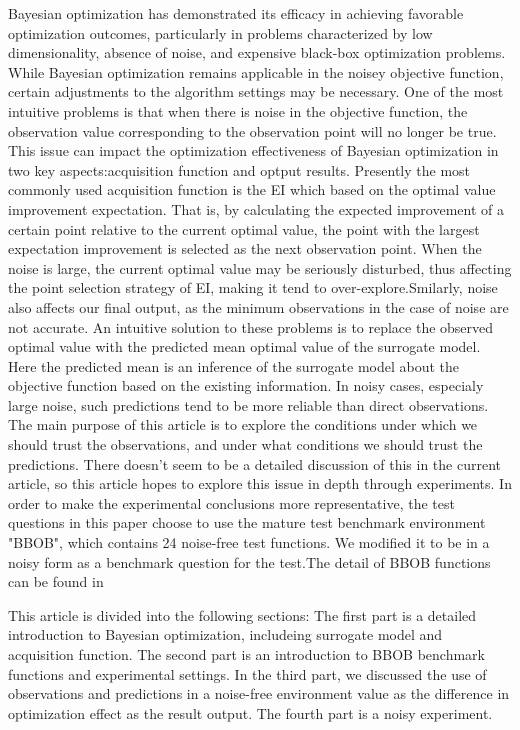 \documentclass{article}
\begin{document}
\hspace{2em}
Bayesian optimization has demonstrated its efficacy in achieving favorable optimization outcomes, particularly in problems characterized by low dimensionality, absence of noise, and expensive black-box optimization problems. While Bayesian optimization remains applicable in the noisey objective function, certain adjustments to the algorithm settings may be necessary. One of the most intuitive problems is that when there is noise in the objective function, the observation value corresponding to the observation point will no longer be true. This issue can impact the optimization effectiveness of Bayesian optimization in two key aspects:acquisition function and optput results. Presently the most commonly used acquisition function is the EI \citep{Jones1998Efficient} which based on the optimal value improvement expectation. That is, by calculating the expected improvement of a certain point relative to the current optimal value, the point with the largest expectation improvement is selected as the next observation point. When the noise is large, the current optimal value may be seriously disturbed, thus affecting the point selection strategy of EI, making it tend to over-explore.Smilarly, noise also affects our final output, as the minimum observations in the case of noise are not accurate. An intuitive solution to these problems is to replace the observed optimal value with the predicted mean optimal value of the surrogate model. Here the predicted mean is an inference of the surrogate model about the objective function based on the existing information. In noisy cases, especialy large noise, such predictions tend to be more reliable than direct observations. The main purpose of this article is to explore the conditions under which we should trust the observations, and under what conditions we should trust the predictions. There doesn't seem to be a detailed discussion of this in the current article, so this article hopes to explore this issue in depth through experiments. In order to make the experimental conclusions more representative, the test questions in this paper choose to use the mature test benchmark environment "BBOB", which contains 24 noise-free test functions. We modified it to be in a noisy form as a benchmark question for the test.The detail of BBOB functions can be found in \citep{Hansen2010RealParameterBO}

\hspace{2em}
This article is divided into the following sections: The first part is a detailed introduction to Bayesian optimization, includeing surrogate model and acquisition function. The second part is an introduction to BBOB benchmark functions and experimental settings. In the third part, we discussed the use of observations and predictions in a noise-free environment value as the difference in optimization effect as the result output. The fourth part is a noisy experiment. 
\end{document}
